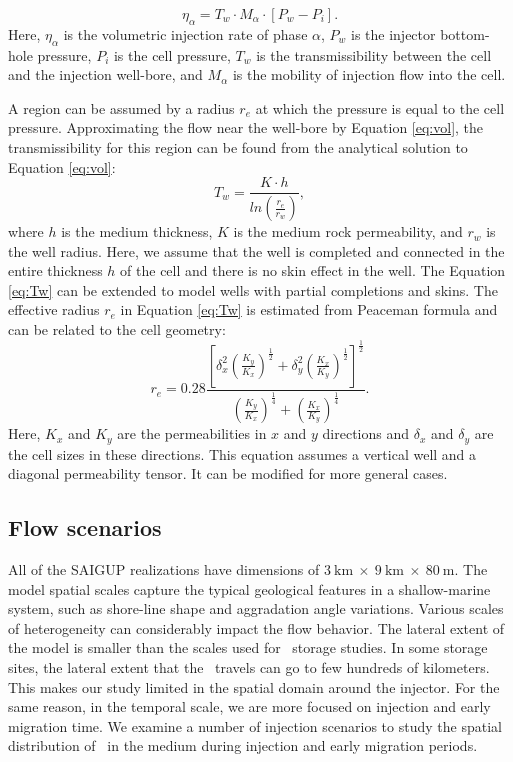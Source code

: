 \begin{equation}
 \eta_{\alpha}=T_w\cdot M_{\alpha}\cdot [P_w-P_{{i}}].
 \label{eq:WFLW}
\end{equation} Here, $\eta_{\alpha}$ is the volumetric injection rate of phase
$\alpha$, $P_w$ is the injector bottom-hole pressure, $P_{{i}}$ is the
cell pressure, $T_{w}$ is the transmissibility between the cell and the
injection well-bore, and $M_\alpha$ is the mobility of injection flow into the
cell. 

A region can be assumed by a radius $r_e$ at which the
pressure is equal to the cell pressure. Approximating the flow near the
well-bore by Equation \ref{eq:vol}, the transmissibility for this region can be
found from the analytical solution to Equation \ref{eq:vol}:
\begin{equation}
 T_w=\frac{K \cdot h}{ln(\frac{r_e}{r_w})},
 \label{eq:Tw}
\end{equation} where $h$ is the medium
thickness, $K$ is the medium rock permeability, and $r_{w}$ is the well radius. Here, we assume that the well is completed and connected in the entire thickness $h$ of the cell and there is no skin effect in the well. The Equation \ref{eq:Tw} can be extended to model wells with partial completions and skins. The effective radius $r_{e}$ in Equation \ref{eq:Tw} is estimated from Peaceman formula and can be related to the cell geometry:
\begin{equation}
r_e =  0.28\frac{\left[
\delta_x^2(\frac{K_y}{K_x})^{\frac{1}{2}}+\delta_y^2(\frac{K_x}{K_y})^{\frac{1}{
2}}\right]^{\frac{1}{2}}}{(\frac{K_y}{K_x})^{\frac{1}{4}}+(\frac{K_x}{K_y})^{
\frac{1}{4}}}.
\label{eq:rinf} 
\end{equation} Here, $K_x$ and $K_y$ are the permeabilities in $x$ and $y$
directions and $\delta_x$ and $\delta_y$ are the cell sizes in these directions.
This equation assumes a vertical well and a diagonal permeability tensor. It can
be modified for more general cases.

\subsection{Flow scenarios}
\label{sec:flowScenarios}

All of the SAIGUP realizations have dimensions of $3~\mbox{km}~\times~9~\mbox{km}~\times~80~\mbox{m}$. The model spatial scales capture the typical geological features in a shallow-marine system, such as shore-line shape and aggradation angle variations. Various scales of heterogeneity can considerably impact the flow behavior. The lateral extent of the model is smaller than the scales used for \coo\ storage studies. In some storage sites, the lateral extent that the \coo\ travels can go to few hundreds of kilometers. This makes our study limited in the spatial domain around the injector. For the same reason, in the temporal scale, we are more focused on injection and early migration time. We examine a number of injection scenarios to study the spatial distribution of \coo\ in the medium during injection and early migration periods.

